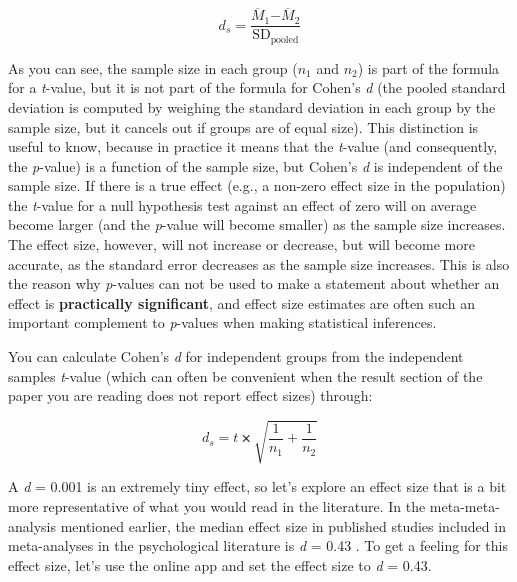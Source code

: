\documentclass[
  oneside]{book}
\begin{document}
\[d_s = \frac{{\overline{M}}_{1}{-\overline{M}}_{2}}{\text{SD}_{\text{pooled}}}\]

As you can see, the sample size in each group (\(n_1\) and \(n_2\)) is part of the formula for a \emph{t}-value, but it is not part of the formula for Cohen's \emph{d} (the pooled standard deviation is computed by weighing the standard deviation in each group by the sample size, but it cancels out if groups are of equal size). This distinction is useful to know, because in practice it means that the \emph{t}-value (and consequently, the \emph{p}-value) is a function of the sample size, but Cohen's \emph{d} is independent of the sample size. If there is a true effect (e.g., a non-zero effect size in the population) the \emph{t}-value for a null hypothesis test against an effect of zero will on average become larger (and the \emph{p}-value will become smaller) as the sample size increases. The effect size, however, will not increase or decrease, but will become more accurate, as the standard error decreases as the sample size increases. This is also the reason why \emph{p}-values can not be used to make a statement about whether an effect is \textbf{practically significant}, and effect size estimates are often such an important complement to \emph{p}-values when making statistical inferences.

You can calculate Cohen's \emph{d} for independent groups from the independent samples \emph{t}-value (which can often be convenient when the result section of the paper you are reading does not report effect sizes) through:

\[d_s = t ⨯ \sqrt{\frac{1}{n_{1}} + \frac{1}{n_{2}}}\]

A \emph{d} = 0.001 is an extremely tiny effect, so let's explore an effect size that is a bit more representative of what you would read in the literature. In the meta-meta-analysis mentioned earlier, the median effect size in published studies included in meta-analyses in the psychological literature is \emph{d} = 0.43 \citep{richard_one_2003}. To get a feeling for this effect size, let's use the online app and set the effect size to \emph{d} = 0.43.
\end{document}
